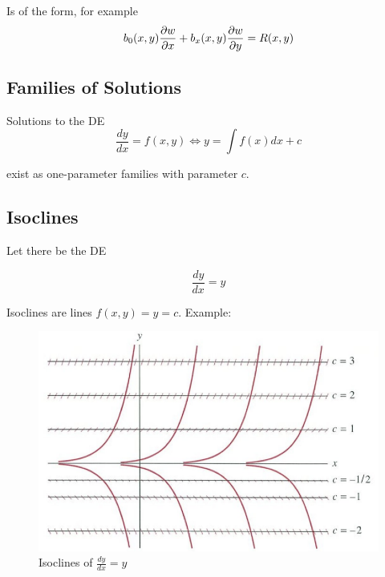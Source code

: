 \begin{definition}[Partial DE]
    Is of the form, for example
    \begin{equation*}
        b_0(x,y)\frac{\partial w}{\partial x}+b_x(x,y)\frac{\partial w}{\partial y}=R(x,y)
    \end{equation*}
\end{definition}

\subsection{Families of Solutions}

Solutions to the DE
\begin{equation*}
    \frac{dy}{dx}=f(x,y)\Leftrightarrow y=\int f(x)dx+c
\end{equation*}

exist as one-parameter families with parameter $c$.

\subsection{Isoclines}

Let there be the DE

\begin{equation*}
    \frac{dy}{dx}=y
\end{equation*}

Isoclines are lines $f(x,y)=y=c$. Example:

\begin{figure}[H]
    \centering
    \includegraphics[scale=0.75]{figures/Screen Shot 2021-09-27 at 3.25.57 PM.png}
    \caption{Isoclines of $\frac{dy}{dx}=y$}
\end{figure}

